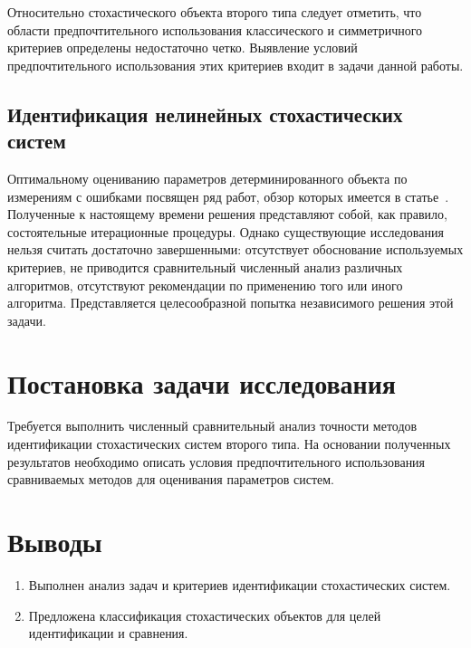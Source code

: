 Относительно стохастического объекта второго типа следует отметить,
что области предпочтительного использования классического и симметричного критериев
определены недостаточно четко.
Выявление условий предпочтительного использования этих критериев входит в задачи данной работы.

\vspace{2\baselineskip}
\subsection{Идентификация нелинейных стохастических систем}\label{ssec:state_nonlinear}

Оптимальному оцениванию параметров детерминированного объекта по измерениям с ошибками
посвящен ряд работ, обзор которых имеется в статье~\cite{fedorov_1978}.
Полученные к настоящему времени решения представляют собой, как правило,
состоятельные итерационные процедуры.
Однако существующие исследования нельзя считать достаточно завершенными:
отсутствует обоснование используемых критериев,
не приводится сравнительный численный анализ различных алгоритмов,
отсутствуют рекомендации по применению того или иного алгоритма.
Представляется целесообразной попытка независимого решения этой задачи.

\vspace{2\baselineskip}
\section{Постановка задачи исследования}

Требуется выполнить численный сравнительный анализ точности
методов идентификации стохастических систем второго типа.
На основании полученных результатов необходимо описать
условия предпочтительного использования сравниваемых методов
для оценивания параметров систем.

\section{Выводы}

\begin{enumerate}
\item Выполнен анализ задач и критериев идентификации стохастических систем.
\item Предложена классификация стохастических объектов для целей
  идентификации и сравнения.
\end{enumerate}